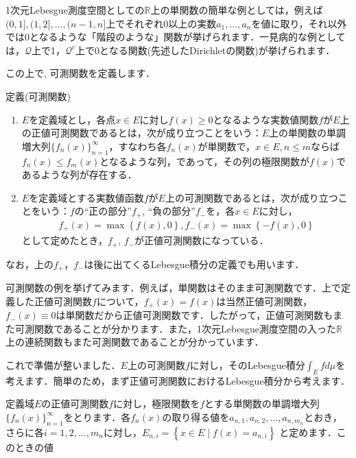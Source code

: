 \par 1次元Lebesgue測度空間としての$\mathbb{R}$上の単関数の簡単な例としては，例えば$(0,1],(1,2],\ldots,(n-1,n]$上でそれぞれ0以上の実数$a_1,\ldots,a_n$を値に取り，それ以外では0となるような「階段のような」関数が挙げられます．一見病的な例としては，$\mathcal{Q}$上で1，$\mathcal{Q}^c$上で0となる関数(先述したDirichletの関数)が挙げられます．
\par この上で, 可測関数を定義します．
\begin{itembox}[l]{定義(可測関数)}
\begin{enumerate}
\item $E$を定義域とし，各点$x\in E$に対し$f(x)\ge 0$となるような実数値関数$f$が$E$上の正値可測関数であるとは，次が成り立つことをいう：$E$上の単関数の単調増大列$\{f_n(x)\}_{n=1}^{\infty}$，すなわち各$f_n(x)$が単関数で，$x\in E, n\le m$ならば$f_{n}(x) \le f_{m}(x)$となるような列，であって，その列の極限関数が$f(x)$であるような列が存在する．
\item $E$を定義域とする実数値函数$f$が$E$上の可測関数であるとは，次が成り立つことをいう：$f$の“正の部分”$f_{+}$, “負の部分”$f_{-}$を，各$x\in E$に対し，
\begin{eqnarray}
f_{+}(x)=\max \left\{f(x),0\right\} , f_{-}(x)=\max \left\{-f(x),0\right\} \nonumber
\end{eqnarray}
として定めたとき，$f_{+}$, $f_{-}$が正値可測関数になっている．
\end{enumerate}
\end{itembox}
\par なお，上の$f_{+}，f_{-}$は後に出てくるLebesgue積分の定義でも用います．
\par 可測関数の例を挙げてみます．例えば，単関数はそのまま可測関数です．上で定義した正値可測関数$f$について，$f_{+}(x)=f(x)$は当然正値可測関数，$f_{-}(x)\equiv 0$は単関数だから正値可測関数です．したがって，正値可測関数もまた可測関数であることが分かります．また，1次元Lebesgue測度空間の入った$\mathbb{R}$上の連続関数もまた可測関数であることが分かっています．
\par これで準備が整いました．$E$上の可測関数$f$に対し，そのLebesgue積分$\displaystyle \int_{E}fd\mu$を考えます．簡単のため，まず正値可測関数におけるLebesgue積分から考えます．
\par 定義域$E$の正値可測関数$f$に対し，極限関数を$f$とする単関数の単調増大列$\{f_{n}(x)\}_{n=1}^{\infty}$をとります．各$f_{n}(x)$の取り得る値を$a_{n,1},a_{n,2},\ldots,a_{n,m_{n}}$とおき，さらに各$i=1,2,\ldots,m_{n}$に対し，$\displaystyle E_{n,i}=\left\{x\in E \mid f(x)=a_{n,i}\right\}$ と定めます．このときの値
